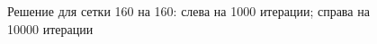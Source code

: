 \documentclass[12pt]{article}
\begin{document}
\begin{figure}[htb!]
\begin{minipage}[h]{0.49\linewidth}
\end{minipage}
\hfill
\begin{minipage}[h]{0.49\linewidth}
\end{minipage}
\caption{Решение для сетки 160 на 160: слева на 1000 итерации; справа на 10000 итерации}
\end{figure}
\end{document}
